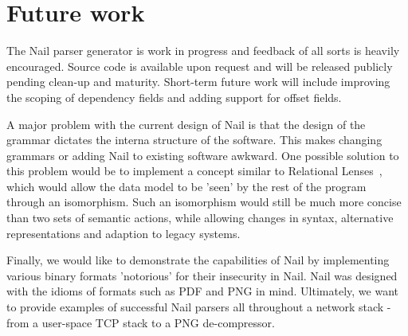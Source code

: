 \section{Future work}

The Nail parser generator is work in progress and feedback of all sorts is heavily
encouraged. Source code is available upon request and will be released publicly pending clean-up and
maturity. Short-term future work will include improving the scoping of dependency fields and adding
support for offset fields.

A major problem with the current design of Nail is that the design of the grammar dictates the
interna structure of the software. This makes changing grammars or adding Nail to existing software
awkward. One possible solution to this problem would be to implement a concept similar to Relational
Lenses~\cite{bohannon2006relational}, which would allow  the data model to be 'seen' by
the rest of the program through an isomorphism. Such an isomorphism would still be much more concise
than two sets of semantic actions, while allowing changes in syntax, alternative representations
and adaption to legacy systems.

Finally, we would like to demonstrate the capabilities of Nail by implementing various binary
formats 'notorious' for their insecurity in Nail. Nail was designed with the idioms of formats such
as PDF and PNG in mind. Ultimately, we want to provide examples of successful Nail parsers all
throughout a network stack - from a user-space TCP stack to a PNG de-compressor.

